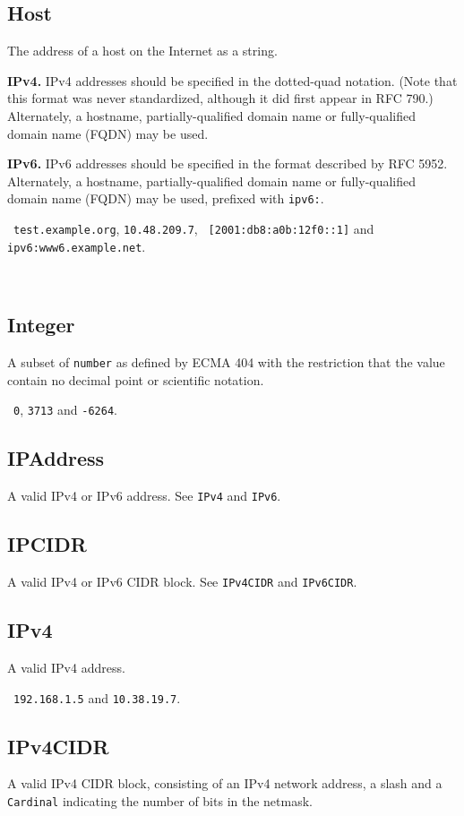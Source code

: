 \documentclass[10pt]{article}
\begin{document}
\subsection{Host}
The address of a host on the Internet as a string.

{\bf IPv4.}  IPv4 addresses should be specified in the dotted-quad
notation.  (Note that this format was never standardized, although it
did first appear in RFC 790.)  Alternately, a hostname,
partially-qualified domain name or fully-qualified domain name (FQDN)
may be used.

{\bf IPv6.}  IPv6 addresses should be specified in the format
described by RFC 5952.  Alternately, a hostname, partially-qualified
domain name or fully-qualified domain name (FQDN) may be used,
prefixed with {\tt ipv6:}.  

\example\ {\tt test.example.org}, {\tt 10.48.209.7}, {\tt
  [2001:db8:a0b:12f0::1]} and {\tt ipv6:www6.example.net}.

\\


\subsection{Integer}
A subset of {\tt number} as defined by ECMA 404 with the restriction
that the value contain no decimal point or scientific notation.

\example\ {\tt 0}, {\tt 3713} and {\tt -6264}.

\subsection{IPAddress}
A valid IPv4 or IPv6 address.  See {\tt IPv4} and {\tt IPv6}.


\subsection{IPCIDR}
A valid IPv4 or IPv6 CIDR block.  See {\tt IPv4CIDR} and {\tt IPv6CIDR}.


\subsection{IPv4}
A valid IPv4 address.

\example\ {\tt 192.168.1.5} and {\tt 10.38.19.7}.


\subsection{IPv4CIDR}
A valid IPv4 CIDR block, consisting of an IPv4 network address, a
slash and a {\tt Cardinal} indicating the number of bits in the
netmask.
\end{document}

